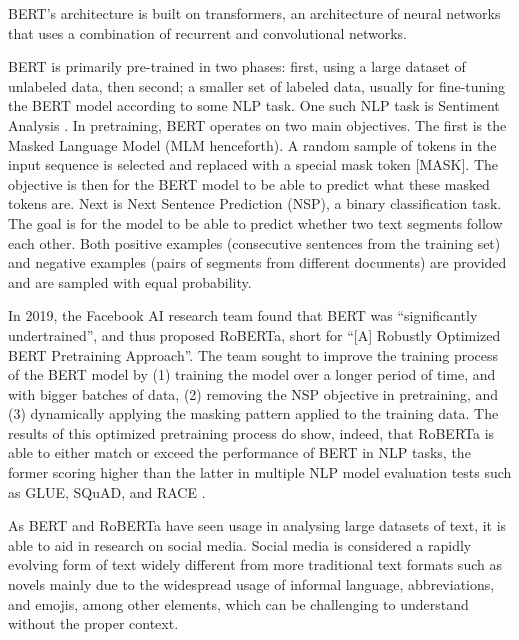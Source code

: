 BERT’s architecture is built on transformers, an architecture of neural networks that uses a combination of recurrent and convolutional networks. 

BERT is primarily pre-trained in two phases: first, using a large dataset of unlabeled data, then second; a smaller set of labeled data, usually for fine-tuning the BERT model according to some NLP task. One such NLP task is Sentiment Analysis \cite{RRL_Koroteev-2021}. In pretraining, BERT operates on two main objectives. The first is the Masked Language Model (MLM henceforth). A random sample of tokens in the input sequence is selected and replaced with a special mask token [MASK]. The objective is then for the BERT model to be able to predict what these masked tokens are. Next is Next Sentence Prediction (NSP), a binary classification task. The goal is for the model to be able to predict whether two text segments follow each other. Both positive examples (consecutive sentences from the training set) and negative examples (pairs of segments from different documents) are provided and are sampled with equal probability.

In 2019, the Facebook AI research team found that BERT was “significantly undertrained”, and thus proposed RoBERTa, short for “[A] Robustly Optimized BERT Pretraining Approach”. The team sought to improve the training process of the BERT model by (1) training the model over a longer period of time, and with bigger batches of data, (2) removing the NSP objective in pretraining, and (3) dynamically applying the masking pattern applied to the training data. The results of this optimized pretraining process do show, indeed, that RoBERTa is able to either match or exceed the performance of BERT in NLP tasks, the former scoring higher than the latter in multiple NLP model evaluation tests such as GLUE, SQuAD, and RACE \cite{RRL_Liu-2019}.

As BERT and RoBERTa have seen usage in analysing large datasets of text, it is able to aid in research on social media. Social media is considered a rapidly evolving form of text widely different from more traditional text formats such as novels mainly due to the widespread usage of informal language, abbreviations, and emojis, among other elements, which can be challenging to understand without the proper context.

